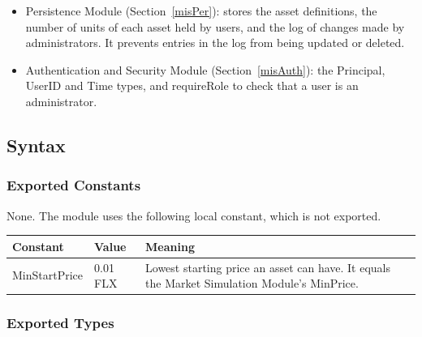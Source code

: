 \documentclass[12pt, titlepage]{article}
\begin{document}
\begin{itemize}
\item Persistence Module (Section~\ref{misPer}): stores the asset
  definitions, the number of units of each asset held by users, and the log
  of changes made by administrators. It prevents entries in the log from
  being updated or deleted.
\item Authentication and Security Module (Section~\ref{misAuth}): the
  Principal, UserID and Time types, and requireRole to check that a user is
  an administrator.
\end{itemize}

\subsection{Syntax}

\subsubsection{Exported Constants}

None. The module uses the following local constant, which is not exported.

\begin{center}
\renewcommand{\arraystretch}{1.2}
\begin{tabular}{l l >{\raggedright\arraybackslash}p{7cm}}
\toprule
\textbf{Constant} & \textbf{Value} & \textbf{Meaning}\\
\midrule
\textsf{MinStartPrice} & 0.01 FLX & Lowest starting price an asset can have.
  It equals the Market Simulation Module's \textsf{MinPrice}.\\
\bottomrule
\end{tabular}
\end{center}

\subsubsection{Exported Types}
\end{document}
